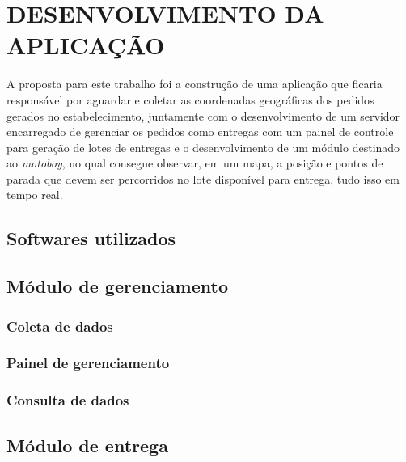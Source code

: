 
\chapter{DESENVOLVIMENTO DA APLICAÇÃO}
A proposta para este trabalho foi a construção de uma aplicação que ficaria responsável
por aguardar e coletar as coordenadas geográficas dos pedidos gerados no estabelecimento,
juntamente com o desenvolvimento de um servidor encarregado de gerenciar os pedidos como entregas
com um painel de controle para geração de lotes de entregas e o desenvolvimento de um módulo destinado ao \textit{motoboy}, no qual consegue observar, em um mapa, a posição e pontos de parada que devem ser percorridos no lote disponível para entrega, tudo isso em tempo real.

\section{Softwares utilizados}

\section{Módulo de gerenciamento}

\subsection{Coleta de dados}

\subsection{Painel de gerenciamento}

\subsection{Consulta de dados}

\section{Módulo de entrega}